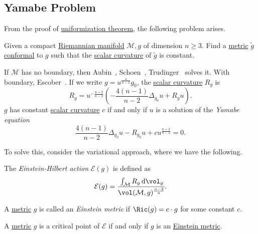 \subsection{Yamabe Problem}
From the proof of \hyperref[thm:uniformization]{uniformization theorem}, the following problem arises.

\begin{problem}\label{prb:Yamabe}
Given a compact \hyperref[def:Riemannian-manifold]{Riemannian manifold} \(\mathcal{M} , g\) of dimension \(n \geq 3\). Find a \hyperref[def:Riemannian-metric]{metric} \(\widetilde{g} \) \hyperref[def:conformal]{conformal} to \(g\) such that the \hyperref[def:Ricci-scalar-curvature]{scalar curvature} of \(\widetilde{g} \) is constant.
\end{problem}

If \(\mathcal{M} \) has no boundary, then Aubin~\cite{Aubin1976ProblmesIE, Aubin1976EquationsDN}, Schoen~\cite{Schoen1984ConformalDO}, Trudinger~\cite{ASNSP_1968_3_22_2_265_0} solves it. With boundary, Escober~\cite{escobar1992yamabe}. If we write \(g = u^{\frac{4}{n-2}} g_0\), the \hyperref[def:Ricci-scalar-curvature]{scalar curvature} \(R_g\) is
\begin{equation}\label{eq:lec28}
	R_g
	= u^{-\frac{u+2}{n-2}} \left( - \frac{4(n-1)}{n-2} \Delta _{g_0} u + R_g u \right) .
\end{equation}
\(g\) has constant \hyperref[def:Ricci-scalar-curvature]{scalar curvature} \(c\) if and only if \(u\) is a solution of the \emph{Yamabe equation}
\begin{equation}\label{eq:Yamabe}
	\frac{4(n-1)}{n-2} \Delta _{g_0} u - R_{g_0} u + cu^{\frac{n+2}{n-2}} = 0.
\end{equation}

To solve this, consider the variational approach, where we have the following.

\begin{definition}\label{def:Einstein-Hilbert-action}
	The \emph{Einstein-Hilbert action} \(\mathcal{E} (g)\) is defined as
	\[
		\mathcal{E} (g) = \cfrac{\int _\mathcal{M} R_g \,\mathrm{d} \vol _g}{\vol(\mathcal{M} , g)^{\frac{n-2}{n}} }.
	\]
\end{definition}

\begin{definition}\label{def:Einstein-metric}
	A \hyperref[def:Riemannian-metric]{metric} \(g\) is called an \emph{Einstein metric} if \(\Ric(g) = c\cdot g \) for some constant \(c\).
\end{definition}
\begin{remark}
	A \hyperref[def:Riemannian-metric]{metric} \(g\) is a critical point of \(\mathcal{E} \) if and only if \(g\) is an \hyperref[def:Einstein-metric]{Einstein metric}.
\end{remark}


